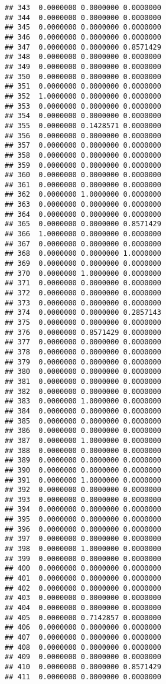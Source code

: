 \documentclass[
]{article}
\begin{document}
\begin{verbatim}
## 343  0.0000000 0.0000000 0.0000000
## 344  0.0000000 0.0000000 0.0000000
## 345  0.0000000 0.0000000 0.0000000
## 346  0.0000000 0.0000000 0.0000000
## 347  0.0000000 0.0000000 0.8571429
## 348  0.0000000 0.0000000 0.0000000
## 349  0.0000000 0.0000000 0.0000000
## 350  0.0000000 0.0000000 0.0000000
## 351  0.0000000 0.0000000 0.0000000
## 352  1.0000000 0.0000000 0.0000000
## 353  0.0000000 0.0000000 0.0000000
## 354  0.0000000 0.0000000 0.0000000
## 355  0.0000000 0.1428571 0.0000000
## 356  0.0000000 0.0000000 0.0000000
## 357  0.0000000 0.0000000 0.0000000
## 358  0.0000000 0.0000000 0.0000000
## 359  0.0000000 0.0000000 0.0000000
## 360  0.0000000 0.0000000 0.0000000
## 361  0.0000000 0.0000000 0.0000000
## 362  0.0000000 1.0000000 0.0000000
## 363  0.0000000 0.0000000 0.0000000
## 364  0.0000000 0.0000000 0.0000000
## 365  0.0000000 0.0000000 0.8571429
## 366  1.0000000 0.0000000 0.0000000
## 367  0.0000000 0.0000000 0.0000000
## 368  0.0000000 0.0000000 1.0000000
## 369  0.0000000 0.0000000 0.0000000
## 370  0.0000000 1.0000000 0.0000000
## 371  0.0000000 0.0000000 0.0000000
## 372  0.0000000 0.0000000 0.0000000
## 373  0.0000000 0.0000000 0.0000000
## 374  0.0000000 0.0000000 0.2857143
## 375  0.0000000 0.0000000 0.0000000
## 376  0.0000000 0.8571429 0.0000000
## 377  0.0000000 0.0000000 0.0000000
## 378  0.0000000 0.0000000 0.0000000
## 379  0.0000000 0.0000000 0.0000000
## 380  0.0000000 0.0000000 0.0000000
## 381  0.0000000 0.0000000 0.0000000
## 382  0.0000000 0.0000000 0.0000000
## 383  0.0000000 1.0000000 0.0000000
## 384  0.0000000 0.0000000 0.0000000
## 385  0.0000000 0.0000000 0.0000000
## 386  0.0000000 0.0000000 0.0000000
## 387  0.0000000 1.0000000 0.0000000
## 388  0.0000000 0.0000000 0.0000000
## 389  0.0000000 0.0000000 0.0000000
## 390  0.0000000 0.0000000 0.0000000
## 391  0.0000000 1.0000000 0.0000000
## 392  0.0000000 0.0000000 0.0000000
## 393  0.0000000 0.0000000 0.0000000
## 394  0.0000000 0.0000000 0.0000000
## 395  0.0000000 0.0000000 0.0000000
## 396  0.0000000 0.0000000 0.0000000
## 397  0.0000000 0.0000000 0.0000000
## 398  0.0000000 1.0000000 0.0000000
## 399  0.0000000 0.0000000 0.0000000
## 400  0.0000000 0.0000000 0.0000000
## 401  0.0000000 0.0000000 0.0000000
## 402  0.0000000 0.0000000 0.0000000
## 403  0.0000000 0.0000000 0.0000000
## 404  0.0000000 0.0000000 0.0000000
## 405  0.0000000 0.7142857 0.0000000
## 406  0.0000000 0.0000000 0.0000000
## 407  0.0000000 0.0000000 0.0000000
## 408  0.0000000 0.0000000 0.0000000
## 409  0.0000000 0.0000000 0.0000000
## 410  0.0000000 0.0000000 0.8571429
## 411  0.0000000 0.0000000 0.0000000

\end{verbatim}
\end{document}
